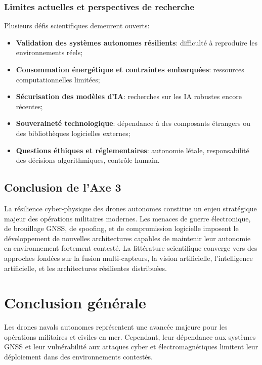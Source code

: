 \documentclass[12pt, a4paper, twoside, openright]{report}
\begin{document}
\subsection{Limites actuelles et perspectives de recherche}
Plusieurs défis scientifiques demeurent ouverts:
\begin{itemize}
    \item \textbf{Validation des systèmes autonomes résilients}: difficulté à reproduire les environnements réels;
    \item \textbf{Consommation énergétique et contraintes embarquées}: ressources computationnelles limitées;
    \item \textbf{Sécurisation des modèles d’IA}: recherches sur les IA robustes encore récentes;
    \item \textbf{Souveraineté technologique}: dépendance à des composants étrangers ou des bibliothèques logicielles externes;
    \item \textbf{Questions éthiques et réglementaires}: autonomie létale, responsabilité des décisions algorithmiques, contrôle humain.
\end{itemize}

\section{Conclusion de l'Axe 3}
La résilience cyber-physique des drones autonomes constitue un enjeu stratégique majeur des opérations militaires modernes. Les menaces de guerre électronique, de brouillage GNSS, de spoofing, et de compromission logicielle imposent le développement de nouvelles architectures capables de maintenir leur autonomie en environnement fortement contesté. La littérature scientifique converge vers des approches fondées sur la fusion multi-capteurs, la vision artificielle, l’intelligence artificielle, et les architectures résilientes distribuées.

\cleardoublepage

\chapter{Conclusion générale}
Les drones navals autonomes représentent une avancée majeure pour les opérations militaires et civiles en mer. Cependant, leur dépendance aux systèmes GNSS et leur vulnérabilité aux attaques cyber et électromagnétiques limitent leur déploiement dans des environnements contestés.
\end{document}
